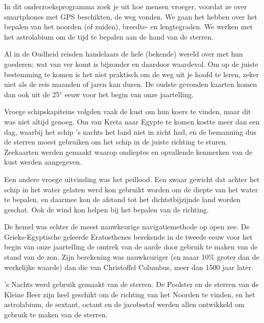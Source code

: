 In dit onderzoeksprogramma zoek je uit hoe mensen vroeger, voordat ze over smartphones met GPS beschikten, de weg vonden. We gaan het hebben over het bepalen van het noorden (of zuiden), breedte- en lengtegraden. We werken met het astrolabium om de tijd te bepalen aan de hand van de sterren.

Al in de Oudheid reisden handelaars de hele (bekende) wereld over met hun goederen; wat van ver komt is bijzonder en daardoor waardevol. Om op de juiste bestemming te komen is het niet praktisch om de weg uit je hoofd te leren, zeker niet als de reis maanden of jaren kan duren. De oudste gevonden kaarten komen dan ook uit de 25$^{e}$ eeuw voor het begin van onze jaartelling. 

Vroege schipskapiteins volgden vaak de kust om hun koers te vinden, maar dit was niet altijd genoeg. Om van Kreta naar Egypte te komen kostte meer dan een dag, waarbij het schip 's nachts het land niet in zicht had, en de bemanning dus de sterren moest gebruiken om het schip in de juiste richting te sturen. Zeekaarten werden gemaakt waarop ondieptes en opvallende kenmerken van de kust werden aangegeven.

Een andere vroege uitvinding was het peillood. Een zwaar gewicht dat achter het schip in het water gelaten werd kon gebruikt worden om de diepte van het water te bepalen, en daarmee kon de afstand tot het dichtstbijzijnde land worden geschat. Ook de wind kon helpen bij het bepalen van de richting.

De hemel was echter de meest nauwkeurige navigatiemethode op open zee. De Grieks-Egyptische geleerde Eratosthenes berekende in de tweede eeuw voor het begin van onze jaartelling de omtrek van de aarde door gebruik te maken van de stand van de zon. Zijn berekening was nauwkeuriger (en maar 10$\%$ groter dan de werkelijke waarde) dan die van Christoffel Columbus, meer dan 1500 jaar later.

's Nachts werd gebruik gemaakt van de sterren. De Poolster en de sterren van de Kleine Beer zijn heel geschikt om de richting van het Noorden te vinden, en het astrolabium, de sextant, octant en de jacobsstaf werden allen ontwikkeld om gebruik te maken van de sterren.


